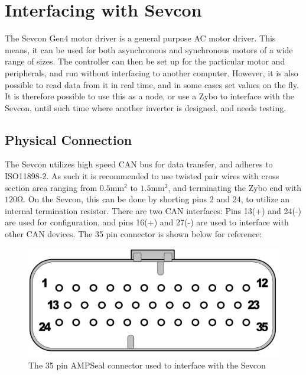 

\section{Interfacing with Sevcon}\label{sec:interfacin_with_sevcon}
The Sevcon Gen4 motor driver is a general purpose AC motor driver. 
This means, it can be used for both asynchronous and synchronous motors of a wide range of sizes.
The controller can then be set up for the particular motor and peripherals, and run without interfacing to another computer.
However, it is also possible to read data from it in real time, and in some cases set values on the fly.
It is therefore possible to use this as a node, or use a Zybo to interface with the Sevcon, until such time where another inverter is designed, and needs testing. \\

\subsection{Physical Connection}\label{sub:sevcon_physical_connection}
The Sevcon utilizes high speed CAN bus for data transfer, and adheres to ISO11898-2.
As such it is recommended to use twisted pair wires with cross section area ranging from $0.5 \si{\milli \meter \squared}$ to $1.5 \si{\milli \meter \squared}$, and terminating the Zybo end with $120 \si{\ohm}$.
On the Sevcon, this can be done by shorting pins 2 and 24, to utilize an internal termination resistor.
There are two CAN interfaces: Pins 13(+) and 24(-) are used for configuration, and pins 16(+) and 27(-) are used to interface with other CAN devices.
The 35 pin connector is shown below for reference:

\begin{figure}[h]
	\centering
	\includegraphics[width = 0.6\linewidth]{graphics/35_pin_dsub}
	\caption{The 35 pin AMPSeal connector used to interface with the Sevcon}
	\label{fig:35_pin_dsub}
\end{figure}

